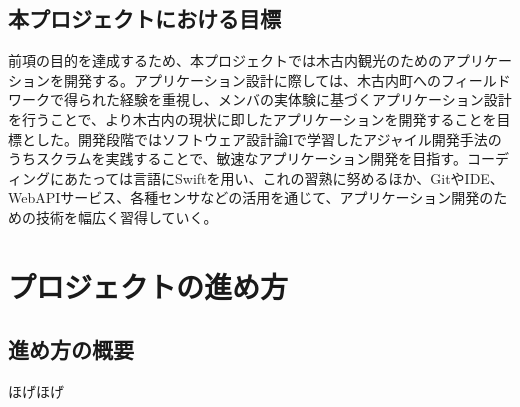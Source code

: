 \section{本プロジェクトにおける目標}
前項の目的を達成するため、本プロジェクトでは木古内観光のためのアプリケーションを開発する。アプリケーション設計に際しては、木古内町へのフィールドワークで得られた経験を重視し、メンバの実体験に基づくアプリケーション設計を行うことで、より木古内の現状に即したアプリケーションを開発することを目標とした。開発段階ではソフトウェア設計論Iで学習したアジャイル開発手法のうちスクラムを実践することで、敏速なアプリケーション開発を目指す。コーディングにあたっては言語にSwiftを用い、これの習熟に努めるほか、GitやIDE、WebAPIサービス、各種センサなどの活用を通じて、アプリケーション開発のための技術を幅広く習得していく。

\chapter{プロジェクトの進め方}
\section{進め方の概要}
ほげほげ
